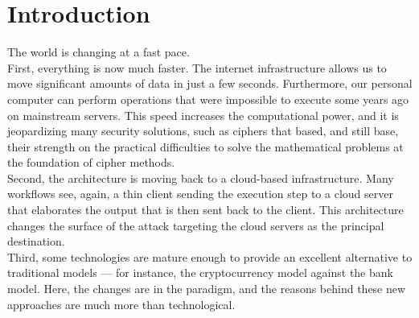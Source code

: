 \documentclass[12pt]{article}
\begin{document}
	\newpage
	\section{Introduction}
	The world is changing at a fast pace.\\
	First, everything is now much faster. The internet infrastructure allows us to move significant amounts of data in just a few seconds. Furthermore, our personal computer can perform operations that were impossible to execute some years ago on mainstream servers. This speed increases the computational power, and it is jeopardizing many security solutions, such as ciphers that based, and still base, their strength on the practical difficulties to solve the mathematical problems at the foundation of cipher methods.\\
	Second, the architecture is moving back to a cloud-based infrastructure. Many workflows see, again, a thin client sending the execution step to a cloud server that elaborates the output that is then sent back to the client. This architecture changes the surface of the attack targeting the cloud servers as the principal destination.\\
	Third, some technologies are mature enough to provide an excellent alternative to traditional models — for instance, the cryptocurrency model against the bank model. Here, the changes are in the paradigm, and the reasons behind these new approaches are much more than technological.\\
		
\end{document}
